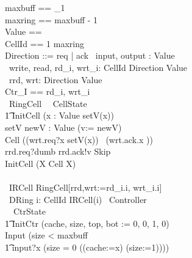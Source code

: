 \documentclass{llncs}
\begin{document}
\begin{circus}
maxbuff == \nat_1 \\
maxring == maxbuff - 1 \\
Value == \nat \\
CellId == 1 \upto maxring \\
Direction ::=  req | ack
    \also
    \circchannel\ input, output : Value \\
    \circchannel\ write, read, rd\_i, wrt\_i: CellId \cross Direction \cross Value \\
    \circchannel\ rrd, wrt: Direction \cross Value \\
    \circchannelset Ctr\_I == \lchanset rd\_i, wrt\_i \rchanset \\
    \circprocess\ RingCell \circdef \circbegin\ \circstate\ CellState  \\
    \t1 InitCell \circdef (\Intchoice x : Value \circspot setV(x)) \\
        setV \circdef \circval newV : Value \circspot (v:= newV) \\
        Cell \circdef ((wrt.req?x \then setV(x)) \circseq\ (wrt.ack.x \then \Skip))  \\
            \extchoice rrd.req?dumb \then rrd.ack!v \then Skip
        \\
        \circspot InitCell \circseq (\circmu X \circspot Cell \circseq X)
    \\
    \circend
    \\
    \circprocess\ IRCell \circdef RingCell[rrd,wrt:=rd\_i.i, wrt\_i.i]
    \\
    \circprocess\ DRing \circdef \Interleave i: CellId \circspot IRCell(i)
    \also
    \circprocess\ Controller \circdef \\
    \circbegin\ \circstate\ CtrState  \\
    \t1
        InitCtr \circdef (cache, size, top, bot := 0, 0, 1, 0) \\
        Input \circdef (\lcircguard size < maxbuff \rcircguard \circguard \\
                    \t1
                        input?x \then (\lcircguard size = 0 \rcircguard \circguard ((cache:=x) \circseq (size:=1)))) \\

\end{circus}
\end{document}
